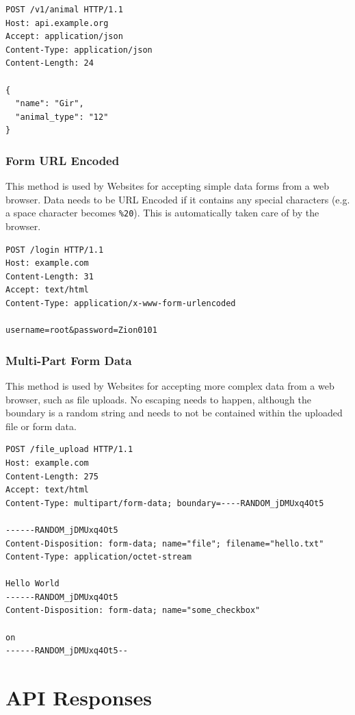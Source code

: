 \documentclass{book}
\begin{document}
\begin{verbatim}
POST /v1/animal HTTP/1.1
Host: api.example.org
Accept: application/json
Content-Type: application/json
Content-Length: 24

{
  "name": "Gir",
  "animal_type": "12"
}
\end{verbatim}

\subsection{Form URL Encoded}

This method is used by Websites for accepting simple data forms from a web browser. Data needs to be URL Encoded if it contains any special characters (e.g. a space character becomes \texttt{\%20}). This is automatically taken care of by the browser.

\begin{verbatim}
POST /login HTTP/1.1
Host: example.com
Content-Length: 31
Accept: text/html
Content-Type: application/x-www-form-urlencoded

username=root&password=Zion0101
\end{verbatim}

\subsection{Multi-Part Form Data}

This method is used by Websites for accepting more complex data from a web browser, such as file uploads. No escaping needs to happen, although the boundary is a random string and needs to not be contained within the uploaded file or form data.

\begin{verbatim}
POST /file_upload HTTP/1.1
Host: example.com
Content-Length: 275
Accept: text/html
Content-Type: multipart/form-data; boundary=----RANDOM_jDMUxq4Ot5

------RANDOM_jDMUxq4Ot5
Content-Disposition: form-data; name="file"; filename="hello.txt"
Content-Type: application/octet-stream

Hello World
------RANDOM_jDMUxq4Ot5
Content-Disposition: form-data; name="some_checkbox"

on
------RANDOM_jDMUxq4Ot5--
\end{verbatim}


\chapter{API Responses}
\end{document}
